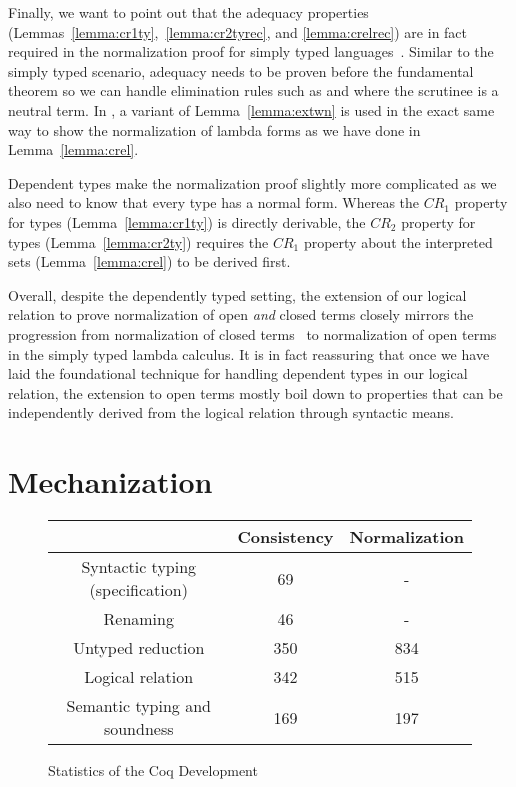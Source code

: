 \documentclass[acmsmall,screen=true,
\ifpublic review=false\else,review=true\fi
  ,anonymous=\ifanonymous true\else false\fi]{acmart}
\newcommand{\scw}[1]{}
\begin{document}
\scw{Name and foreshadow these lemmas when they are introduced so that
it is easier to refer to them in the discussion.}
Finally, we want to point out that
the adequacy properties (Lemmas~\ref{lemma:cr1ty},~\ref{lemma:cr2tyrec}, and
\ref{lemma:crelrec}) are in fact required in the normalization proof
for simply typed languages~\citep{abel2019poplmark}. Similar to the
simply typed scenario, adequacy needs to be proven before the
fundamental theorem so we can handle elimination rules such as
 and  where the scrutinee is a neutral term. In
\citet{abel2019poplmark}, a variant of Lemma~\ref{lemma:extwn} is used
in the exact same way to show the normalization of lambda forms
as we have done in Lemma~\ref{lemma:crel}.

Dependent types make the normalization proof slightly more complicated
as we also need to know that every type has a normal form.
Whereas the
$CR_1$ property for types (Lemma~\ref{lemma:cr1ty}) is directly
derivable, the $CR_2$ property for types (Lemma~\ref{lemma:cr2ty})
requires the $CR_1$ property about the interpreted sets
(Lemma~\ref{lemma:crel}) to be derived first.

Overall, despite the dependently typed setting,
the extension of our logical relation to prove normalization of open
\emph{and} closed terms closely mirrors the progression from
normalization of closed terms~\citep{harpertait} to normalization of
open terms~\citep{harperkripke} in the simply typed lambda calculus.
It is in fact reassuring that once we have laid the foundational
technique for handling dependent types in our logical relation, the
extension to open terms mostly boil down to properties that can be
independently derived from the logical relation through syntactic
means.

\section{Mechanization}
\label{sec:logrelmech}
\begin{figure}[h]
  \begin{tabular}{ c |  c  | c  }
    & Consistency & Normalization \\
    \hline
    Syntactic typing (specification) &  69 & - \\
    Renaming & 46 & -  \\
    Untyped reduction & 350 & 834 \\
    Logical relation & 342 & 515 \\
    Semantic typing and soundness & 169 & 197 \\
  \end{tabular}
  \caption{Statistics of the Coq Development}
  \label{fig:linecount}
\end{figure}
\end{document}
